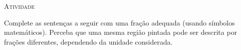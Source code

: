 \documentclass[10 pt,usenames,dvipsnames, oneside]{article}
\begin{document}
\bigskip
\begin{center}
{\large \scshape Atividade}
\end{center}
\fi

Complete as sentenças a seguir com uma fração adequada (usando símbolos matemáticos). Perceba que uma mesma região pintada pode ser descrita por frações diferentes, dependendo da unidade considerada.

\def \tripinha{ (30:4) -- (90:4) -- (150:4)--(210:4)--(270:4)--(330:4) [shift={({4*sqrt(3)},0)}] --(270:4) -- (330:4) -- (30:4) -- (90:4)--(150:4)--cycle;}
\def \tripa{ (30:4) -- (90:4) -- (150:4)--(210:4)--(270:4)--(330:4) [shift={({4*sqrt(3)},0)}] --(270:4) -- (330:4) [shift={({4*sqrt(3)},0)}]--  (270:4) -- (330:4) -- (30:4) -- (90:4)--(150:4) [shift={({-4*sqrt(3)},0)}] -- (90:4) -- (150:4)--cycle;}
\end{document}
